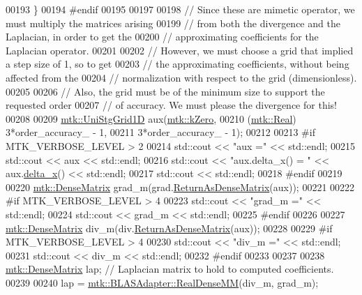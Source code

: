 \begin{DoxyCode}
00193   \}
00194 \textcolor{preprocessor}{  #endif}
00195 
00197 
00198   \textcolor{comment}{// Since these are mimetic operator, we must multiply the matrices arising}
00199   \textcolor{comment}{// from both the divergence and the Laplacian, in order to get the}
00200   \textcolor{comment}{// approximating coefficients for the Laplacian operator.}
00201 
00202   \textcolor{comment}{// However, we must choose a grid that implied a step size of 1, so to get}
00203   \textcolor{comment}{// the approximating coefficients, without being affected from the}
00204   \textcolor{comment}{// normalization with respect to the grid (dimensionless).}
00205 
00206   \textcolor{comment}{// Also, the grid must be of the minimum size to support the requested order}
00207   \textcolor{comment}{// of accuracy. We must please the divergence for this!}
00208 
00209   \hyperlink{classmtk_1_1UniStgGrid1D}{mtk::UniStgGrid1D} aux(\hyperlink{group__c01-roots_ga59a451a5fae30d59649bcda274fea271}{mtk::kZero},
00210                         (\hyperlink{group__c01-roots_gac080bbbf5cbb5502c9f00405f894857d}{mtk::Real}) 3*order\_accuracy\_ - 1,
00211                         3*order\_accuracy\_ - 1);
00212 
00213 \textcolor{preprocessor}{  #if MTK\_VERBOSE\_LEVEL > 2}
00214   std::cout << \textcolor{stringliteral}{"aux ="} << std::endl;
00215   std::cout << aux << std::endl;
00216   std::cout << \textcolor{stringliteral}{"aux.delta\_x() = "} << aux.\hyperlink{classmtk_1_1UniStgGrid1D_a6e7173b01241632cf509496d66b9f74c}{delta\_x}() << std::endl;
00217   std::cout << std::endl;
00218 \textcolor{preprocessor}{  #endif}
00219 
00220   \hyperlink{classmtk_1_1DenseMatrix}{mtk::DenseMatrix} grad\_m(grad.\hyperlink{classmtk_1_1Grad1D_a77b2eddbe4ab03f469306c604d505b1a}{ReturnAsDenseMatrix}(aux));
00221 
00222 \textcolor{preprocessor}{  #if MTK\_VERBOSE\_LEVEL > 4}
00223   std::cout << \textcolor{stringliteral}{"grad\_m ="} << std::endl;
00224   std::cout << grad\_m << std::endl;
00225 \textcolor{preprocessor}{  #endif}
00226 
00227   \hyperlink{classmtk_1_1DenseMatrix}{mtk::DenseMatrix} div\_m(div.\hyperlink{classmtk_1_1Div1D_a213fddbaaf86e4840c6a9649b69c2d49}{ReturnAsDenseMatrix}(aux));
00228 
00229 \textcolor{preprocessor}{  #if MTK\_VERBOSE\_LEVEL > 4}
00230   std::cout << \textcolor{stringliteral}{"div\_m ="} << std::endl;
00231   std::cout << div\_m << std::endl;
00232 \textcolor{preprocessor}{  #endif}
00233 
00237 
00238   \hyperlink{classmtk_1_1DenseMatrix}{mtk::DenseMatrix} lap; \textcolor{comment}{// Laplacian matrix to hold to computed coefficients.}
00239 
00240   lap = \hyperlink{classmtk_1_1BLASAdapter_acebd0e9bfe0bdd609c7fbea98ccfd3b5}{mtk::BLASAdapter::RealDenseMM}(div\_m, grad\_m);

\end{DoxyCode}
